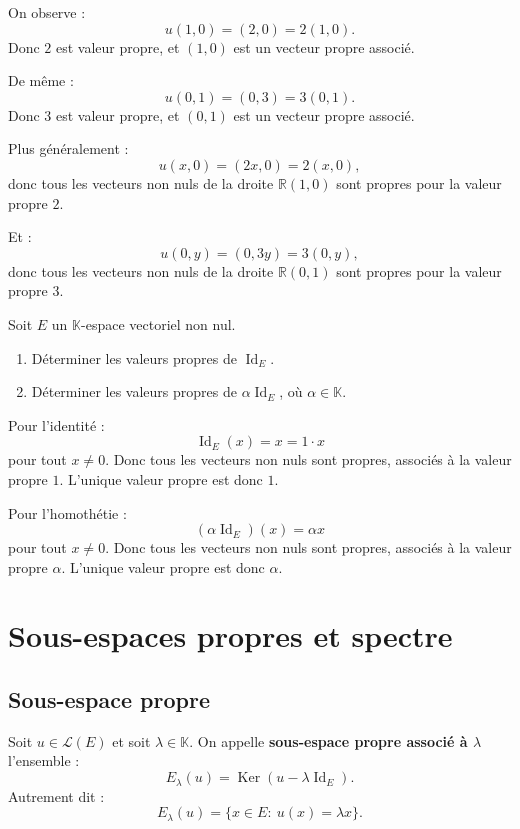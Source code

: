 \documentclass[11pt,a4paper]{article}
\newcommand{\K}{\mathbb K}
\newcommand{\R}{\mathbb R}
\newcommand{\Lcal}{\mathcal L}
\newcommand{\Ker}{\operatorname{Ker}}
\newcommand{\Id}{\operatorname{Id}}
\begin{document}
\begin{correctionbox}
On observe :
\[
u(1,0)=(2,0)=2(1,0).
\]
Donc \(2\) est valeur propre, et \((1,0)\) est un vecteur propre associé.

De même :
\[
u(0,1)=(0,3)=3(0,1).
\]
Donc \(3\) est valeur propre, et \((0,1)\) est un vecteur propre associé.

Plus généralement :
\[
u(x,0)=(2x,0)=2(x,0),
\]
donc tous les vecteurs non nuls de la droite \(\R(1,0)\) sont propres pour la valeur propre \(2\).

Et :
\[
u(0,y)=(0,3y)=3(0,y),
\]
donc tous les vecteurs non nuls de la droite \(\R(0,1)\) sont propres pour la valeur propre \(3\).
\end{correctionbox}

\begin{exercicebox}
Soit \(E\) un \(\K\)-espace vectoriel non nul.
\begin{enumerate}
    \item Déterminer les valeurs propres de \(\Id_E\).
    \item Déterminer les valeurs propres de \(\alpha\Id_E\), où \(\alpha\in\K\).
\end{enumerate}
\end{exercicebox}

\begin{correctionbox}
Pour l'identité :
\[
\Id_E(x)=x=1\cdot x
\]
pour tout \(x\neq0\).  
Donc tous les vecteurs non nuls sont propres, associés à la valeur propre \(1\).  
L'unique valeur propre est donc \(1\).

Pour l'homothétie :
\[
(\alpha\Id_E)(x)=\alpha x
\]
pour tout \(x\neq0\).  
Donc tous les vecteurs non nuls sont propres, associés à la valeur propre \(\alpha\).  
L'unique valeur propre est donc \(\alpha\).
\end{correctionbox}

\section{Sous-espaces propres et spectre}

\subsection{Sous-espace propre}

\begin{definitionbox}
Soit \(u\in\Lcal(E)\) et soit \(\lambda\in\K\).  
On appelle \textbf{sous-espace propre associé à \(\lambda\)} l'ensemble :
\[
E_\lambda(u)=\Ker(u-\lambda\Id_E).
\]
Autrement dit :
\[
E_\lambda(u)=\{x\in E:\ u(x)=\lambda x\}.
\]
\end{definitionbox}
\end{document}
